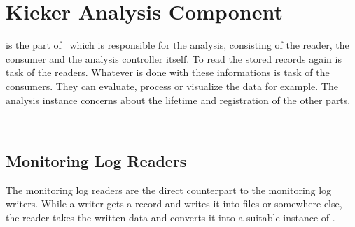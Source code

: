 % 


\chapter{Kieker Analysis Component}\label{chap:componentsAnalysis}
	
	\class{\KiekerAnalysisPart} is the part of \Kieker\  which is responsible for the analysis, consisting of the reader, the consumer and the analysis controller itself. To read the stored records again is task of the readers. Whatever is done with these informations is task of the consumers. They can evaluate, process or visualize the data for example. The analysis instance concerns about the lifetime and registration of the other parts.

\


	\section{Monitoring Log Readers}

		The monitoring log readers are the direct counterpart to the monitoring log writers. While a writer gets a record and writes it into files or somewhere else, the reader takes the written data and converts it into a suitable instance of .

\


